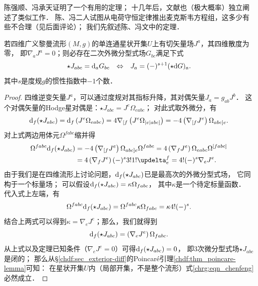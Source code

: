 陈强顺、冯承天\cite{chen-feng1989-cn,chen-yu1993-en}证明了一个有用的定理；
十几年后，文献\parencite{hehl-Obukhov-2003}也（极大概率）独立阐述了类似工作．
陈、冯二人试图从电荷守恒定律推出麦克斯韦方程组，这多少有些不合理（见后面评论）；
我们先叙述陈、冯文中的定理．
\begin{theorem}\label{chrg:thm_chenfeng}
	若四维广义黎曼流形$(M,g)$的单连通星状开集$U$上有切矢量场$J^a$，其四维散度为零，
	即$\nabla_a J^a=0$；则必存在二次外微分型式场$G_{bc}$满足下式
	\begin{equation}\label{chrg:eqn_chenfeng}
		\star J_{abc} = {\rm d}_a G_{bc}  {\quad  \Leftrightarrow \quad} J_a = (-)^{s+1} ( \star {\rm d}G  )_a .
	\end{equation}
	其中$s$是度规$g$的惯性指数中$-1$个数．
\end{theorem}
\begin{proof}
	四维逆变矢量$J^a$，可以通过度规对其指标升降，其对偶矢量${J_a} = {g_{ab}}{J^b}$．
	这个对偶矢量的Hodge星对偶是：$\star J_{abc} = {J^e}\Omega _{eabc}$；
	对此式取外微分，有
	\begin{equation*}
		{\rm d}_f(\star {J_{abc}}) = {{\text{d}}_f}\left( {{J^e}{\Omega _{eabc}}} \right)
		= 4{\nabla _{[f}}\left( {{J^e}{\Omega _{|e|abc]}}} \right)
		= -4\left( {{\nabla _{[f}}{J^e}} \right){\Omega _{abc]e}} .
	\end{equation*}
	对上式两边用体元${\Omega ^{fabc}}$缩并得
	\begin{align*}
		{\Omega ^{fabc}}{\rm d}_f (\star {J_{abc}}) &=- 4\left( {{\nabla _{[f}}{J^e}} \right)
		{\Omega _{abc]e}}{\Omega ^{fabc}} = 4\left( {{\nabla _f}{J^e}} \right)
		{\Omega _{eabc}}{\Omega ^{[fabc]}} \\
		&= 4\left( {{\nabla _f}{J^e}} \right){(-)^s}
		3!1!\updelta _e^f = 4!{(- )^s}{\nabla _e}{J^e} .
	\end{align*}
	由于我们是在四维流形上讨论问题，${\rm d}_f (\star {J_{abc}})$已是最高次的外微分型式场，
	它同构于一个标量场；    可以假设${\rm d}_f (\star {J_{abc}}) = \kappa {\Omega _{fabc}}$，
	其中$\kappa$是一个待定标量函数． 代入式上左端，有
	\begin{equation*}
		{\Omega ^{fabc}}{\rm d}_f (\star {J_{abc}}) = {\Omega ^{fabc}}\kappa
		{\Omega _{fabc}} = \kappa 4!{(-)^s} .
	\end{equation*}
	结合上两式可以得到$\kappa  = {\nabla _e}{J^e}$；那么，我们就得到
	\begin{equation}\label{chrg:eqn_dJ=nJO}
		{\rm d}_f (\star {J_{abc}}) = \left( {{\nabla _e}{J^e}} \right){\Omega _{fabc}} .
	\end{equation}
	从上式以及定理已知条件（$\nabla_e J^e=0$）可得${\rm d}_f (\star {J_{abc}}) = 0$，
	即3次微分型式场$\star {J_{abc}}$是闭的；
	那么从\S\ref{chdf:sec_exterior-diff}的Poincar\'e引理\ref{chdf:thm_poincare-lemma}可知：
	在星状开集$U$内（局部开集，不是整个流形）式\eqref{chrg:eqn_chenfeng}必然成立．
\end{proof}

